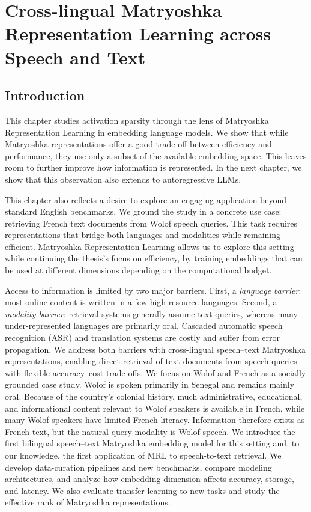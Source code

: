 \chapter[Cross-lingual MRL]{Cross-lingual Matryoshka Representation Learning across Speech and Text}\label{ch:mrl}
\section{Introduction}
This chapter studies activation sparsity through the lens of Matryoshka Representation Learning
in embedding language models. We show that while Matryoshka representations offer a good trade-off
between efficiency and performance, they use only a subset of the available embedding space.
This leaves room to further improve how information is represented. In the next chapter, we
show that this observation also extends to autoregressive LLMs.

This chapter also reflects a desire to explore an engaging application beyond standard
English benchmarks. We ground the study in a concrete use case: retrieving French text
documents from Wolof speech queries. This task requires representations that bridge both
languages and modalities while remaining efficient. Matryoshka Representation Learning
allows us to explore this setting while continuing the thesis's focus on efficiency, by
training embeddings that can be used at different dimensions depending on the computational
budget.

Access to information is limited by two major barriers. First, a \emph{language barrier}: most online content is written in a few high-resource languages. Second, a \emph{modality barrier}: retrieval systems generally assume text queries, whereas many under-represented languages are primarily oral. Cascaded automatic speech recognition (ASR) and translation systems are costly and suffer from error propagation. We address both barriers with cross-lingual speech--text Matryoshka representations, enabling direct retrieval of text documents from speech queries with flexible accuracy--cost trade-offs.
We focus on Wolof and French as a socially grounded case study. Wolof is spoken primarily in Senegal and remains mainly oral. Because of the country's colonial history, much administrative, educational, and informational content relevant to Wolof speakers is available in French, while many Wolof speakers have limited French literacy. Information therefore exists as French text, but the natural query modality is Wolof speech.
We introduce the first bilingual speech--text Matryoshka embedding model for this setting and, to our knowledge, the first application of MRL to speech-to-text retrieval. We develop data-curation pipelines and new benchmarks, compare modeling architectures, and analyze how embedding dimension affects accuracy, storage, and latency. We also evaluate transfer learning to new tasks and study the effective rank of Matryoshka representations.

